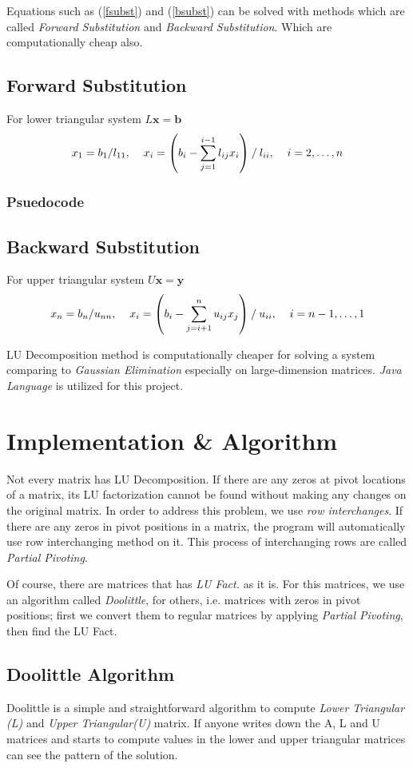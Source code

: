 \documentclass{article}
\newcommand{\bx}{{\mathbf x}}
\newcommand{\by}{{\mathbf y}}
\newcommand{\bb}{{\mathbf b}}
\begin{document}
Equations such as (\ref{fsubst}) and (\ref{bsubst}) can be solved with methods which are called \textit{Forward Substitution} and \textit{Backward Substitution}. Which are computationally cheap also.
\subsection{Forward Substitution}
For lower triangular system $L{\bx}={\bb}$
\begin{equation}
  x_1 = b_1/l_{11},\hspace{4mm} x_i = \left( b_i - \sum_{j=1}^{i-1}l_{ij}x_i\right) \mathbin{/} l_{ii}, \hspace{4mm} i =2,\ldots,n
\end{equation}
\subsubsection{Psuedocode}

\subsection{Backward Substitution}
For upper triangular system $U{\bx}={\by}$
\begin{equation}
  x_n = b_n/u_{nn},\hspace{4mm} x_i = \left( b_i - \sum_{j=i+1}^{n}u_{ij}x_j\right) \mathbin{/} u_{ii}, \hspace{4mm} i =n -1,\ldots,1
\end{equation}

LU Decomposition method is computationally cheaper for solving a system comparing to \textit{Gaussian Elimination} especially on large-dimension matrices. 	\textit{Java Language} is utilized for this project. \\
	\section{Implementation \& Algorithm}
	
Not every matrix has LU Decomposition. If there are any zeros at pivot locations of a matrix, its LU factorization cannot be found without making any changes on the original matrix. In order to address this problem, we use \textit{row interchanges}. If there are any zeros in pivot positions in a matrix, the program will automatically use row interchanging method on it. This process of interchanging rows are called \textit{Partial Pivoting}.

Of course, there are matrices that has \textit{LU Fact.} as it is. For this matrices, we use an algorithm called \textit{Doolittle}, for others, i.e. matrices with zeros in pivot positions; first we convert them to regular matrices by applying \textit{Partial Pivoting}, then find the LU Fact.
\subsection{Doolittle Algorithm}
	Doolittle is a simple and straightforward algorithm to compute \textit{Lower Triangular (L)} and \textit{Upper Triangular(U)} matrix. If anyone writes down the A, L and U matrices and starts to compute values in the lower and upper triangular matrices can see the pattern of the solution. 

	
	
\end{document}
